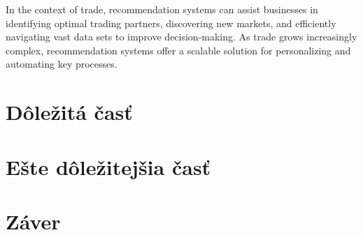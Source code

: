 \documentclass[10pt,twoside,slovak,a4paper]{article}
\begin{document}
In the context of trade, recommendation systems can assist businesses in identifying optimal trading partners, discovering new markets, and efficiently navigating vast data sets to improve decision-making. As trade grows increasingly complex, recommendation systems offer a scalable solution for personalizing and automating key processes.



\section{Dôležitá časť} \label{dolezita}




\section{Ešte dôležitejšia časť} \label{dolezitejsia}




\section{Záver} \label{zaver} %







\end{document}
